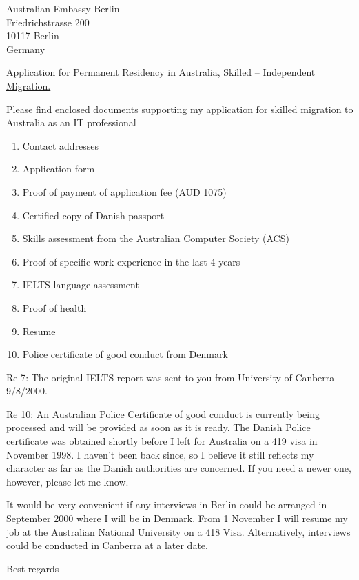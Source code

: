 \documentclass[12pt]{letter}
\begin{document}
\address{Dr.\ Ole M{\o}ller Nielsen     \\
         Computer Sciences Laboratory, RSISE   \\
         Australian National University \\
         Canberra, ACT 0200}

\signature{Ole M{\o}ller Nielsen}

\begin{letter}
{Australian Embassy Berlin \\
 Friedrichstrasse 200 \\
 10117 Berlin \\
 Germany}
 
\opening{\underline{Application for Permanent Residency in Australia, 
Skilled -- Independent Migration.}}

Please find enclosed documents supporting my application for skilled
migration to \mbox{Australia} as an IT professional 

\begin{enumerate} 
  \item Contact addresses
  \item Application form
  \item Proof of payment of application fee (AUD 1075)
  \item Certified copy of Danish passport
  \item Skills assessment from the Australian Computer Society (ACS)
  \item Proof of specific work experience in the last 4 years
  \item IELTS language assessment
  \item Proof of health
  \item Resume
  \item Police certificate of good conduct from Denmark
\end{enumerate}

\noindent Re 7: The original IELTS report was sent to you from University 
of Canberra 9/8/2000.

\noindent Re 10: An Australian Police Certificate of good conduct is 
currently being processed and will be provided as soon as it is ready.
The Danish Police certificate was obtained shortly 
before I left for Australia on a 419 visa in November 1998. 
I haven't been back since, so I believe it still reflects my 
character as far as the Danish authorities are concerned.
If you need a newer one, however, please let me know.

\noindent It would be very convenient if any interviews in Berlin 
could be arranged in September 2000 where I will be in Denmark.
From 1 November I will resume my job at the 
Australian National University on a 418 Visa. 
Alternatively, interviews could be conducted in Canberra at a later date.


\closing{Best regards}

\end{letter}
\end{document}
